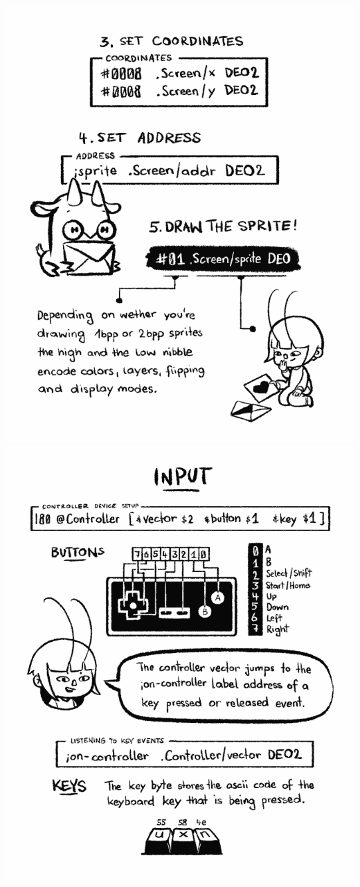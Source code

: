 \documentclass[paperheight=4.25in,paperwidth=2.75in,20pt]{article}
\begin{document}
  \includegraphics[width=1.0\paperwidth]{images/12_drawing_sprites2-680.png}
  \includegraphics[width=1.0\paperwidth]{images/13_input-680.png}
\end{document}
